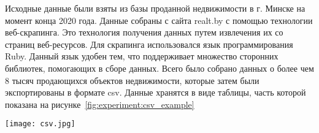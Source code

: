 Исходные данные были взяты из базы проданной недвижимости в г. Минске на момент конца 2020 года.
Данные собраны с сайта realt.by с помощью технологии веб-скрапинга. Это технология получения данных путем извлечения
их со страниц веб-ресурсов. Для скрапинга использовался язык программирования Ruby. Данный язык удобен тем, что
поддерживает множество сторонних библиотек, помогающих в сборе данных.
Всего было собрано данных о более чем 8 тысяч продающихся объектов недвижимости, которые затем были
экспортированы в формате csv.
Данные хранятся в виде таблицы, часть которой показана на рисунке~\ref{fig:experiment:csv_example}

\begin{sidewaysfigure}
  \centering
    \texttt{[image: csv.jpg]}
    \caption{Исходные данные в csv формате}
    \label{fig:experiment:csv_example}
\end{sidewaysfigure}
